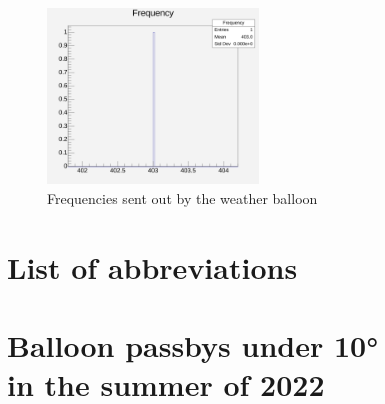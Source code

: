 \documentclass[11pt,a4paper,faculty=we,language=en,doctype=report]{cls/ugent-doc}
\begin{document}
\begin{figure}
  \centering
  \includegraphics[width=0.5\textwidth]{Frequencies.pdf}
  \caption{Frequencies sent out by the weather balloon}
  \label{fig:BalloonFreq}
\end{figure}

\appendix
\chapter{List of abbreviations}
\chapter{Balloon passbys under 10°\\ in the summer of 2022}
\label{app:10Deg}
\begin{table}[h!]
\end{table}
\begin{table}
\end{table}
\begin{table}
\end{table}
\begin{table}
\end{table}
\begin{table}
\end{table}

\newpage


\end{document}
